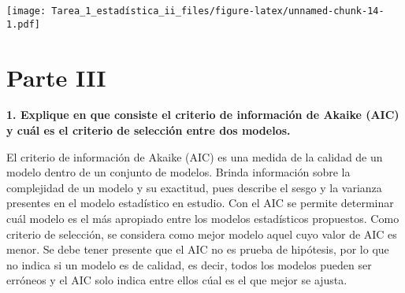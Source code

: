 \documentclass[
]{article}
\newenvironment{Shaded}{\begin{snugshade}}{\end{snugshade}}
\newcommand{\AttributeTok}[1]{\textcolor[rgb]{0.13,0.29,0.53}{#1}}
\newcommand{\DecValTok}[1]{\textcolor[rgb]{0.00,0.00,0.81}{#1}}
\newcommand{\FunctionTok}[1]{\textcolor[rgb]{0.13,0.29,0.53}{\textbf{#1}}}
\newcommand{\NormalTok}[1]{#1}
\newcommand{\SpecialCharTok}[1]{\textcolor[rgb]{0.81,0.36,0.00}{\textbf{#1}}}
\newcommand{\StringTok}[1]{\textcolor[rgb]{0.31,0.60,0.02}{#1}}
\begin{document}
\begin{Shaded}
\end{Shaded}

\texttt{[image: Tarea\_1\_estadística\_ii\_files/figure-latex/unnamed-chunk-14-1.pdf]}

\hypertarget{parte-iii}{%
\section{Parte III}\label{parte-iii}}

\textbf{1. Explique en que consiste el criterio de información de Akaike
(AIC) y cuál es el criterio de selección entre dos modelos.}

El criterio de información de Akaike (AIC) es una medida de la calidad
de un modelo dentro de un conjunto de modelos. Brinda información sobre
la complejidad de un modelo y su exactitud, pues describe el sesgo y la
varianza presentes en el modelo estadístico en estudio. Con el AIC se
permite determinar cuál modelo es el más apropiado entre los modelos
estadísticos propuestos. Como criterio de selección, se considera como
mejor modelo aquel cuyo valor de AIC es menor. Se debe tener presente
que el AIC no es prueba de hipótesis, por lo que no indica si un modelo
es de calidad, es decir, todos los modelos pueden ser erróneos y el AIC
solo indica entre ellos cúal es el que mejor se ajusta.
\end{document}
